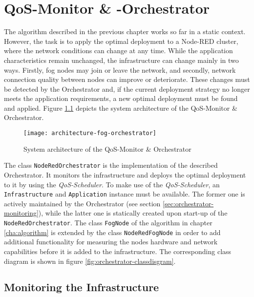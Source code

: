 \chapter{QoS-Monitor \& -Orchestrator\label{cha:orchestrator}}

The algorithm described in the previous chapter works so far in a static context.
However, the task is to apply the optimal deployment to a Node-RED cluster, where the network conditions can change at any time. While the application characteristics remain unchanged, the infrastructure can change mainly in two ways. Firstly, fog nodes may join or leave the network, and secondly, network connection quality between nodes can improve or deteriorate. These changes must be detected by the Orchestrator and, if the current deployment strategy no longer meets the application requirements, a new optimal deployment must be found and applied. Figure \ref{fig:orchestrator-system-architecture} depicts the system architecture of the QoS-Monitor \& Orchestrator.

\begin{figure}[h!]
    \centering
    \texttt{[image: architecture-fog-orchestrator]}
    \caption{System architecture of the QoS-Monitor \& Orchestrator}
    \label{fig:orchestrator-system-architecture}
\end{figure}

The class \texttt{NodeRedOrchestrator} is the implementation of the described Orchestrator.
It monitors the infrastructure and deploys the optimal deployment to it by using the \textit{QoS-Scheduler}.
To make use of the \textit{QoS-Scheduler}, an \texttt{Infrastructure} and \texttt{Application} instance must be available. The former one is actively maintained by the Orchestrator (see section \ref{sec:orchestrator-monitoring}), while the latter one is statically created upon start-up of the \texttt{NodeRedOrchestrator}.
The class \texttt{FogNode} of the algorithm in chapter \ref{cha:algorithm} is extended by the class \texttt{NodeRedFogNode} in order to add additional functionality for measuring the nodes hardware and network capabilities before it is added to the infrastructure.
The corresponding class diagram is shown in figure \ref{fig:orchestrator-classdisgram}.

\section{Monitoring the Infrastructure\label{sec:orchestrator-monitoring}}

